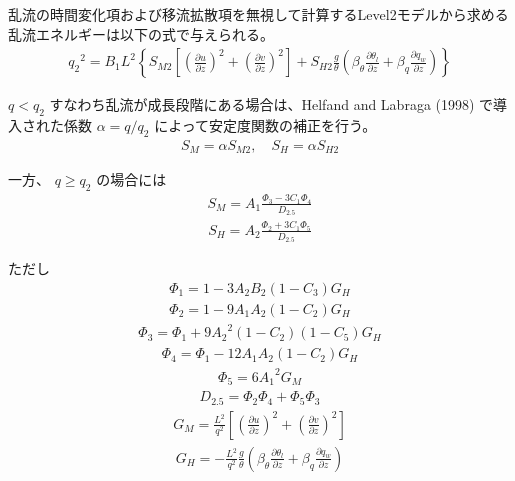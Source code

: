 乱流の時間変化項および移流拡散項を無視して計算するLevel2モデルから求める乱流エネルギーは以下の式で与えられる。
\begin{eqnarray}{q_2}^2=B_1L^2\left\{S_{M2}\left[\left(\frac{\partial u}{\partial z}\right)^2+\left(\frac{\partial v}{\partial z}\right)^2\right]+S_{H2}\frac{g}{\theta}\left(\beta_\theta \frac{\partial \theta_l}{\partial z}+\beta_q \frac{\partial q_w}{\partial z}\right)\right\}\end{eqnarray}

\(q<q_2\) すなわち乱流が成長段階にある場合は、Helfand and Labraga (1998)
で導入された係数 \(\alpha=q/q_2\) によって安定度関数の補正を行う。
\begin{eqnarray}S_M=\alpha S_{M2},\quad S_H=\alpha S_{H2}\end{eqnarray}

一方、 \(q\ge q_2\) の場合には
\begin{eqnarray}S_M=A_1\frac{\Phi_3-3C_1\Phi_4}{D_{2.5}}\end{eqnarray}
\begin{eqnarray}S_H=A_2\frac{\Phi_2+3C_1\Phi_5}{D_{2.5}}\end{eqnarray}

ただし \begin{eqnarray}\Phi_1=1-3A_2B_2(1-C_3)G_H\end{eqnarray} \begin{eqnarray}\Phi_2=1-9A_1A_2(1-C_2)G_H\end{eqnarray}
\begin{eqnarray}\Phi_3=\Phi_1+9{A_2}^2(1-C_2)(1-C_5)G_H\end{eqnarray}
\begin{eqnarray}\Phi_4=\Phi_1-12A_1A_2(1-C_2)G_H\end{eqnarray} \begin{eqnarray}\Phi_5=6{A_1}^2G_M\end{eqnarray}
\begin{eqnarray}D_{2.5}=\Phi_2\Phi_4+\Phi_5\Phi_3\end{eqnarray}
\begin{eqnarray}G_M=\frac{L^2}{q^2}\left[\left(\frac{\partial u}{\partial z}\right)^2+\left(\frac{\partial v}{\partial z}\right)^2\right]\end{eqnarray}
\begin{eqnarray}G_H=-\frac{L^2}{q^2}\frac{g}{\theta}\left(\beta_\theta \frac{\partial \theta_l}{\partial z}+\beta_q \frac{\partial q_w}{\partial z}\right)\end{eqnarray}

